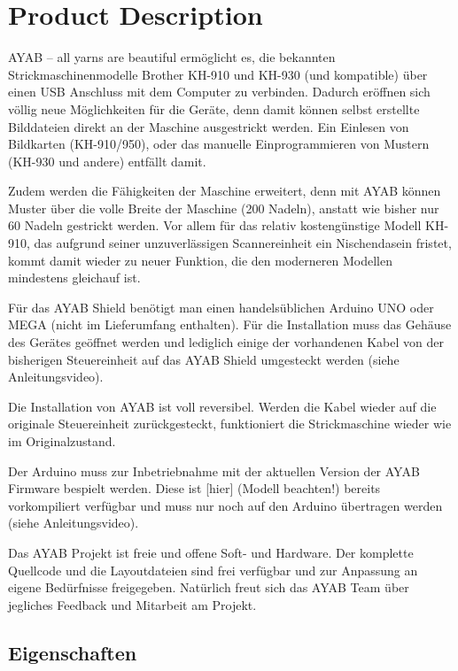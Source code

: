 \documentclass[fleqn,10pt]{SelfArx} %
\begin{document}

\section{Product Description}

AYAB – all yarns are beautiful ermöglicht es, die bekannten Strickmaschinenmodelle
Brother KH-910 und KH-930 (und kompatible) über einen USB Anschluss mit dem Computer zu
verbinden. Dadurch eröffnen sich völlig neue Möglichkeiten für die Geräte, denn damit
können selbst erstellte Bilddateien direkt an der Maschine ausgestrickt werden.
Ein Einlesen von Bildkarten (KH-910/950), oder das manuelle Einprogrammieren von
Mustern (KH-930 und andere) entfällt damit.

Zudem werden die Fähigkeiten der Maschine erweitert, denn mit AYAB können Muster
über die volle Breite der Maschine (200 Nadeln), anstatt wie bisher nur 60 Nadeln
gestrickt werden.
Vor allem für das relativ kostengünstige Modell KH-910, das aufgrund seiner unzuverlässigen
Scannereinheit ein Nischendasein fristet, kommt damit wieder zu neuer Funktion, die den
moderneren Modellen mindestens gleichauf ist.

Für das AYAB Shield benötigt man einen handelsüblichen Arduino UNO oder MEGA (nicht im Lieferumfang enthalten). Für die Installation muss das Gehäuse des Gerätes geöffnet werden und lediglich einige der vorhandenen Kabel von der bisherigen Steuereinheit auf das AYAB Shield umgesteckt werden (siehe Anleitungsvideo).

Die Installation von AYAB ist voll reversibel. Werden die Kabel wieder auf die originale Steuereinheit zurückgesteckt, funktioniert die Strickmaschine wieder wie im Originalzustand.

Der Arduino muss zur Inbetriebnahme mit der aktuellen Version der AYAB Firmware bespielt werden. Diese ist [hier] (Modell beachten!) bereits vorkompiliert verfügbar und muss nur noch auf den Arduino übertragen werden (siehe Anleitungsvideo).

Das AYAB Projekt ist freie und offene Soft- und Hardware. Der komplette Quellcode und die Layoutdateien sind frei verfügbar und zur Anpassung an eigene Bedürfnisse freigegeben. Natürlich freut sich das AYAB Team über jegliches Feedback und Mitarbeit am Projekt.

 \subsection*{Eigenschaften}
\end{document}
